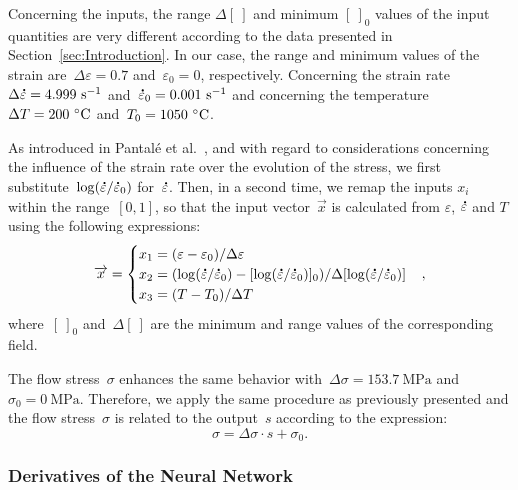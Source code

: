 \documentclass[algorithms,article,accept,pdftex,oneauthor]{Definitions/mdpi}
\DeclareRobustCommand{\mdot}[1]{\accentset{\mbox{\bfseries .}}{#1}}
\DeclareRobustCommand{\ps}{\text{s}^{-1}}
\DeclareRobustCommand{\MPa}{\text{MPa}}
\begin{document}
Concerning the inputs, the range $\Delta[~]$ and minimum $[~]_{0}$ values of the input quantities are very different according to the data presented in Section~\ref{sec:Introduction}.
In our case, the range and minimum values of the strain are~$\Delta\varepsilon=0.7$ and~$\varepsilon_{0}=0$, respectively.
Concerning the strain rate~$\Delta\mdot{\varepsilon}=4.999~\ps$ and~$\mdot{\varepsilon}_{0}=0.001~\ps$ and concerning the temperature~$\Delta T=200~\celsius$ and~$T_{0}=1050~\celsius$.

As introduced in Pantalé et al.~\cite{Pantale-2021-EIN}, and with regard to considerations concerning the influence of the strain rate over the evolution of the stress, we first substitute~$\log(\mdot{\varepsilon}/\mdot{\varepsilon}_{0})$ for~$\mdot{\varepsilon}$.
Then, in a second time, we remap the inputs $x_i$ within the range~$[0,1]$, so that the input vector~$\overrightarrow{x}$ is calculated from $\varepsilon$, $\mdot{\varepsilon}$ and $T$ using the following expressions:
\begin{equation}
\overrightarrow{x}=
\begin{cases}
x_{1} = \left(\varepsilon - \varepsilon_{0}\right)/\Delta\varepsilon \\
x_{2} = \left(\log(\mdot{\varepsilon}/\mdot{\varepsilon}_{0})-[\log(\mdot{\varepsilon}/\mdot{\varepsilon}_{0})]_{0}\right)/\Delta[\log(\mdot{\varepsilon}/\mdot{\varepsilon}_{0})]\\
x_{3} = \left(T-T_{0}\right)/\Delta T
\end{cases},
\label{eq:ANN-input}
\end{equation}
where~$[~]_{0}$ and~$\Delta[~]$ are the minimum and range values of the corresponding field.

The flow stress~$\sigma$ enhances the same behavior with~$\Delta\sigma=153.7~\MPa$ and~$\sigma_{0}=0~\MPa$.
Therefore, we apply the same procedure as previously presented and the flow stress~$\sigma$ is related to the output~$s$ according to the expression: %
\begin{equation}
\sigma = \Delta\sigma\cdot s + \sigma_{0}.\label{eq:ANN-output}
\end{equation}

\subsubsection{Derivatives of the Neural Network}\label{subsubsec:ANN-der}
\end{document}
